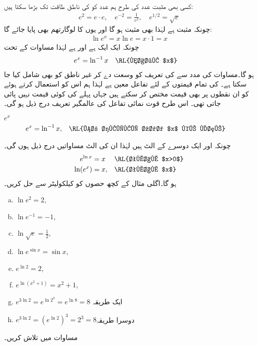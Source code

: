 کسی بھی مثبت عدد کی طرح ہم عدد  کو  کی ناطق طاقت تک بڑھا سکتا ہیں:
\begin{align*}
e^2=e\cdot e,\quad e^{-2}=\frac{1}{e^2},\quad e^{1/2}=\sqrt{e}
\end{align*}
چونکہ  مثبت ہے لہٰذا  بھی مثبت ہو گا اور یوں   کا لوگارتھم بھی پایا جائے گا:
\begin{align}\label{مساوات_ماورائی_قوت_نمائی_لوگارتھم_الف}
\ln e^x=x\ln e=x\cdot 1=x
\end{align} 
چونکہ  ایک ایک ہے اور  ہے لہٰذا مساوات  کے تحت
\begin{align}\label{مساوات_ماورائی_قوت_نمائی_لوگارتھم_ب}
e^x&=\ln^{-1}x&&\text{\RL{ناطق $x$}}
\end{align}
ہو گا۔مساوات  کی مدد سے  کی تعریف کو وسعت دے کر غیر ناطق  کو بھی شامل کیا جا سکتا ہے۔  کی تمام قیمتوں کے لئے تفاعل  معین ہے لہٰذا ہم اس کو استعمال کرتے ہوئے  کو ان نقطوں پر بھی قیمت مختص کر سکتے ہیں جہاں پہلے  کی کوئی قیمت نہیں پائی جاتی تھی۔ اس طرح قوت نمائی تفاعل کی عالمگیر تعریف درج ذیل ہو گی۔

 $e^x$\\
\begin{align*}
e^x&=\ln^{-1}x,&&\text{\RL{ہر حقیقی عدد $x$ کے لئے}}
\end{align*}

چونکہ  اور  ایک دوسرے کے الٹ ہیں لہٰذا ان کی الٹ مساواتیں درج ذیل ہوں گی۔
\begin{align}
e^{\ln x}&=x&&\text{\RL{تمام $x>0$}}\label{مساوات_ماورائی_الٹ_الف}\\
\ln(e^x)&=x,&&\text{\RL{تمام $x$}}\label{مساوات_ماورائی_الٹ_ب}
\end{align}
ہو گا۔اگلی مثال کے کچھ حصوں کو کیلکولیٹر سے حل کریں۔

\begin{multicols}{2}
\begin{enumerate}[a.]
\item
$\ln e^2=2$,
\item
$\ln e^{-1}=-1$,
\item
$ \ln \sqrt{e}=\frac{1}{2}$,
\item
$\ln e^{\sin x}=\sin x$,
\item
$ e^{\ln 2}=2$,
\item
$ e^{\ln(x^2+1)}=x^2+1$,
\item
$e^{3\ln 2}=e^{\ln 2^3}=e^{\ln 8}=8$ \quad ایک طریقہ
\item
$e^{3\ln 2}=(e^{\ln 2})^3=2^3=8$\quad دوسرا طریقہ
\end{enumerate}
\end{multicols}
مساوات  میں  تلاش کریں۔

